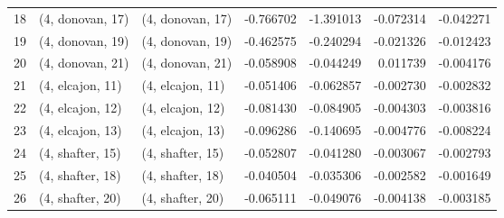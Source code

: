 \begin{tabular}{lllrrrr}
18 &  (4, donovan, 17) &  (4, donovan, 17) & -0.766702 & -1.391013 &  -0.072314 & -0.042271 \\
19 &  (4, donovan, 19) &  (4, donovan, 19) & -0.462575 & -0.240294 &  -0.021326 & -0.012423 \\
20 &  (4, donovan, 21) &  (4, donovan, 21) & -0.058908 & -0.044249 &   0.011739 & -0.004176 \\
21 &  (4, elcajon, 11) &  (4, elcajon, 11) & -0.051406 & -0.062857 &  -0.002730 & -0.002832 \\
22 &  (4, elcajon, 12) &  (4, elcajon, 12) & -0.081430 & -0.084905 &  -0.004303 & -0.003816 \\
23 &  (4, elcajon, 13) &  (4, elcajon, 13) & -0.096286 & -0.140695 &  -0.004776 & -0.008224 \\
24 &  (4, shafter, 15) &  (4, shafter, 15) & -0.052807 & -0.041280 &  -0.003067 & -0.002793 \\
25 &  (4, shafter, 18) &  (4, shafter, 18) & -0.040504 & -0.035306 &  -0.002582 & -0.001649 \\
26 &  (4, shafter, 20) &  (4, shafter, 20) & -0.065111 & -0.049076 &  -0.004138 & -0.003185 \\
\bottomrule
\end{tabular}
